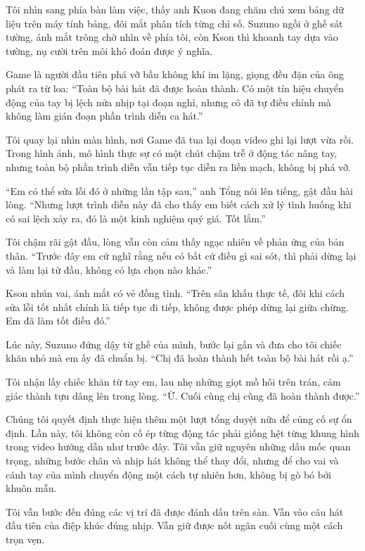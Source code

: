 ﻿\documentclass[../main.tex]{subfiles}
\begin{document}
Tôi nhìn sang phía bàn làm việc, thấy anh Kuon đang chăm chú xem bảng dữ liệu trên máy tính bảng, đôi mắt phân tích từng chỉ số. Suzuno ngồi ở ghế sát tường, ánh mắt trông chờ nhìn về phía tôi, còn Kson thì khoanh tay dựa vào tường, nụ cười trên môi khó đoán được ý nghĩa.

Game là người đầu tiên phá vỡ bầu không khí im lặng, giọng đều đặn của ông phát ra từ loa: ``Toàn bộ bài hát đã được hoàn thành. Có một tín hiệu chuyển động của tay bị lệch nửa nhịp tại đoạn nghỉ, nhưng cô đã tự điều chỉnh mà không làm gián đoạn phần trình diễn ca hát.''

Tôi quay lại nhìn màn hình, nơi Game đã tua lại đoạn video ghi lại lượt vừa rồi. Trong hình ảnh, mô hình thực sự có một chút chậm trễ ở động tác nâng tay, nhưng toàn bộ phần trình diễn vẫn tiếp tục diễn ra liền mạch, không bị phá vỡ.

``Em có thể sửa lỗi đó ở những lần tập sau,'' anh Tổng nói lên tiếng, gật đầu hài lòng. ``Nhưng lượt trình diễn này đã cho thấy em biết cách xử lý tình huống khi có sai lệch xảy ra, đó là một kinh nghiệm quý giá. Tốt lắm.''

Tôi chậm rãi gật đầu, lòng vẫn còn cảm thấy ngạc nhiên về phản ứng của bản thân. ``Trước đây em cứ nghĩ rằng nếu có bất cứ điều gì sai sót, thì phải dừng lại và làm lại từ đầu, không có lựa chọn nào khác.''

Kson nhún vai, ánh mắt có vẻ đồng tình. ``Trên sân khấu thực tế, đôi khi cách sửa lỗi tốt nhất chính là tiếp tục đi tiếp, không được phép dừng lại giữa chừng. Em đã làm tốt điều đó.''

Lúc này, Suzuno đứng dậy từ ghế của mình, bước lại gần và đưa cho tôi chiếc khăn nhỏ mà em ấy đã chuẩn bị. ``Chị đã hoàn thành hết toàn bộ bài hát rồi ạ.''

Tôi nhận lấy chiếc khăn từ tay em, lau nhẹ những giọt mồ hôi trên trán, cảm giác thành tựu dâng lên trong lòng. ``Ừ. Cuối cùng chị cũng đã hoàn thành được.''

\ct

Chúng tôi quyết định thực hiện thêm một lượt tổng duyệt nữa để củng cố sự ổn định. Lần này, tôi không còn cố ép từng động tác phải giống hệt từng khung hình trong video hướng dẫn như trước đây. Tôi vẫn giữ nguyên những dấu mốc quan trọng, những bước chân và nhịp hát không thể thay đổi, nhưng để cho vai và cánh tay của mình chuyển động một cách tự nhiên hơn, không bị gò bó bởi khuôn mẫu.

Tôi vẫn bước đến đúng các vị trí đã được đánh dấu trên sàn. Vẫn vào câu hát đầu tiên của điệp khúc đúng nhịp. Vẫn giữ được nốt ngân cuối cùng một cách trọn vẹn.
\end{document}
